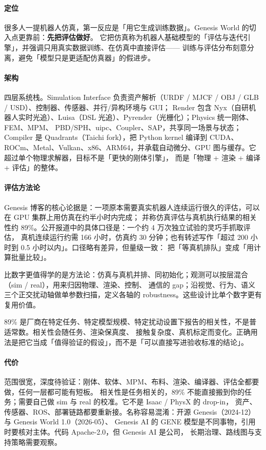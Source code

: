 \documentclass[UTF8, 11pt, a4paper, fontset=windows]{ctexart}
\begin{document}
\paragraph{定位}
很多人一提机器人仿真，第一反应是「用它生成训练数据」。Genesis World 的切入点更靠前：\textbf{先把评估做好}。
它把仿真称为机器人基础模型的「评估与迭代引擎」，并强调只用真实数据训练、在仿真中直接评估——
训练与评估分布刻意分离，避免「模型只是更适配仿真器」的假进步。

\paragraph{架构}
四层系统栈。Simulation Interface 负责资产解析（URDF / MJCF / OBJ / GLB / USD）、控制器、传感器、并行/异构环境与 GUI；
Render 包含 Nyx（自研机器人实时光追）、Luisa（DSL 光追）、Pyrender（光栅化）；Physics 统一刚体、FEM、MPM、
PBD/SPH、uipc、Coupler、SAP，共享同一场景与状态；Compiler 是 Quadrants（Taichi fork），把 Python kernel 编译到
CUDA、ROCm、Metal、Vulkan、x86、ARM64，并承载自动微分、GPU 图与缓存。它超过单个物理求解器，目标不是「更快的刚体引擎」，
而是「物理 + 渲染 + 编译 + 评估」的整体。

\paragraph{评估方法论}
Genesis 博客的核心论据是：一项原本需要真实机器人连续运行很久的评估，可以在 GPU 集群上用仿真在约半小时内完成；
并称仿真评估与真机执行结果的相关性约 89\%。公开报道中的具体口径是：一个约 4 万次独立试验的灵巧手抓取评估，
真机连续运行约需 166 小时，仿真约 30 分钟；也有转述写作「超过 200 小时到 0.5 小时以内」。口径略有差异，但量级一致：
把「等真机排队」变成「用计算批量比较」。

比数字更值得学的是方法论：仿真与真机并排、同初始化；观测可以按层混合（sim / real），用来归因物理、渲染、控制、
通信的 gap；沿视觉、行为、语义三个正交扰动轴做单参数扫描，定义各轴的 robustness。这些设计比单个数字更有复用价值。

\begin{caution}
89\% 是厂商在特定任务、特定模型规模、特定扰动设置下报告的相关性，不是普适常数。相关性会随任务、渲染保真度、
接触复杂度、真机标定而变化。正确用法是把它当成「值得验证的假设」，而不是「可以直接写进验收标准的结论」。
\end{caution}

\paragraph{代价}
范围很宽，深度待验证：刚体、软体、MPM、布料、渲染、编译器、评估全都要做，任何一层都可能有短板。
相关性是任务相关的，89\% 不能直接搬到你的任务；需要自己做 sim 与 real 的校准。它不是 Isaac / PhysX 的 drop-in，
资产、传感器、ROS、部署链路都要重新接。名称容易混淆：开源 Genesis（2024-12）与 Genesis World 1.0（2026-05）、
Genesis AI 的 GENE 模型是不同事物，引用时要核对主体。代码 Apache-2.0，但 Genesis AI 是公司，
长期治理、路线图与支持策略需要观察。
\end{document}
